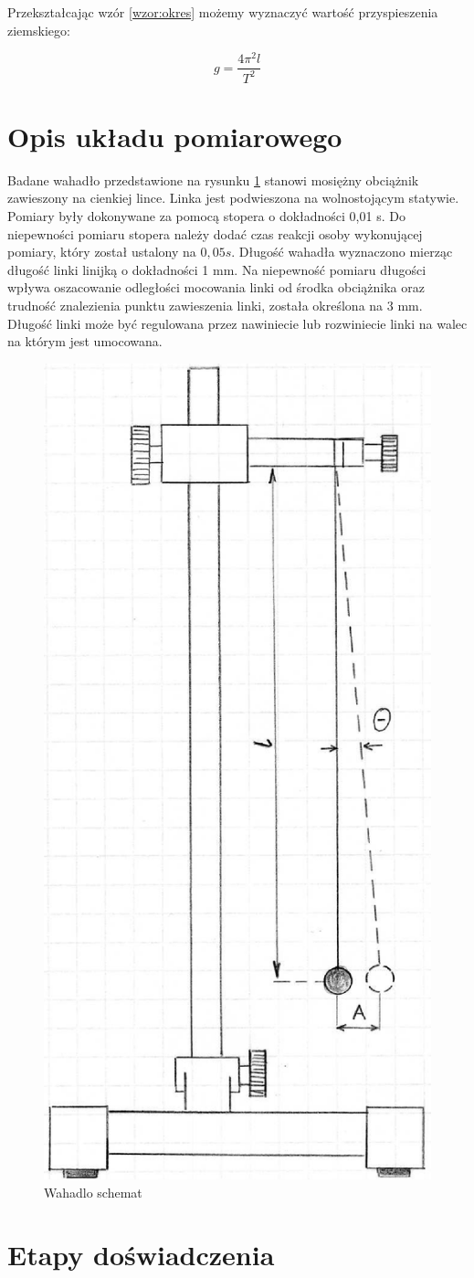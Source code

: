 \documentclass [a4paper,11pt]{article}
\begin{document}
\indent Przekształcając wzór {\ref{wzor:okres}} możemy wyznaczyć wartość przyspieszenia ziemskiego:

\begin{equation}
\label{wzor:przyspieszenie}
g= \frac{4 \pi^2 l}{T^2}
\end{equation}

\section{Opis układu pomiarowego}
\indent Badane wahadło przedstawione na rysunku {\ref{rys:1}} stanowi mosiężny obciążnik zawieszony na cienkiej lince. Linka jest podwieszona na
wolnostojącym statywie. Pomiary były dokonywane za pomocą stopera o dokładności 0,01 s. Do niepewności pomiaru stopera należy dodać czas reakcji osoby wykonującej pomiary, który został ustalony na $0,05 s$. 
Długość wahadła wyznaczono mierząc długość linki linijką o dokładności 1 mm. Na niepewność pomiaru długości wpływa oszacowanie odległości mocowania linki od środka obciążnika oraz trudność znalezienia punktu zawieszenia linki, została określona na 3 mm. Długość linki może być regulowana przez nawiniecie lub rozwiniecie linki na walec na którym jest umocowana.

\begin{figure}
\caption{Wahadlo schemat}
\label{rys:1}
\centering
\includegraphics[width=0.3 \textwidth]{./wahadlo}
\end{figure}

\section{Etapy doświadczenia}
\end{document}
